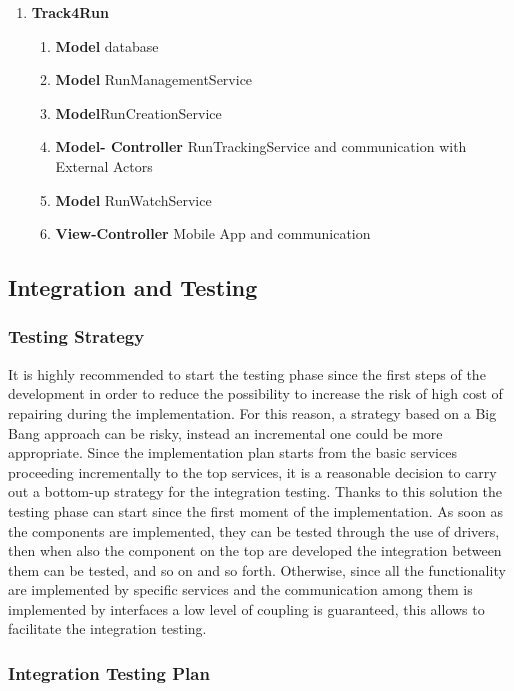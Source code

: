 \documentclass[a4paper]{article}
\begin{document}
\begin{enumerate}
\item \textbf{Track4Run}

\begin{enumerate}
    \item \textbf{Model} database
    \item \textbf{Model} RunManagementService
    \item \textbf{Model}RunCreationService
    \item \textbf{Model- Controller} RunTrackingService and communication with External Actors
    \item \textbf{Model} RunWatchService
    \item \textbf{View-Controller} Mobile App and communication
\end{enumerate}
\end{enumerate}

\subsection{Integration and Testing}

\subsubsection{Testing Strategy}
It is highly recommended to start the testing phase since the first steps of the development in order to reduce the possibility to increase the risk of high cost of repairing during the implementation. For this reason, a strategy based on a Big Bang approach can be risky, instead an incremental one could be more appropriate.
Since the implementation plan starts from the basic services proceeding incrementally to the top services, it is a reasonable decision to carry out a bottom-up strategy for the integration testing.
Thanks to this solution the testing phase can start since the first moment of the implementation. As soon as the components are implemented, they can be tested through the use of drivers, then when also the component on the top are developed the integration between them can be tested, and so on and so forth.
Otherwise, since all the functionality are implemented by specific services and the communication among them is implemented by interfaces a low level of coupling is guaranteed, this allows to facilitate the integration testing.

\subsubsection{Integration Testing Plan}
\end{document}
